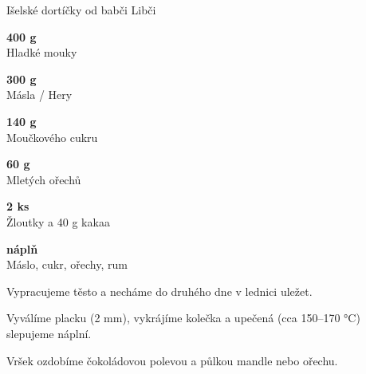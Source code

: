 \documentclass[11pt,a4paper]{article}
\begin{document}

\begin{recipe}[BrickRed]{Išelské dortíčky od babči Libči}
    \begin{ingredients}
        \item \parbox[t]{\linewidth}{\raggedright \weight \textbf{400 g}\\ Hladké mouky}
        \item \parbox[t]{\linewidth}{\raggedright \weight \textbf{300 g}\\ Másla / Hery}
        \item \parbox[t]{\linewidth}{\raggedright \weight \textbf{140 g}\\ Moučkového cukru}
        \item \parbox[t]{\linewidth}{\raggedright \weight \textbf{60 g}\\ Mletých ořechů}
        \item \parbox[t]{\linewidth}{\raggedright \piece \textbf{2 ks}\\ Žloutky a 40 g kakaa}
        \item \parbox[t]{\linewidth}{\raggedright \indefinite \textbf{náplň}\\ Máslo, cukr, ořechy, rum}
    \end{ingredients}
    \begin{steps}
        \item Vypracujeme těsto a necháme do druhého dne v lednici uležet.
        \item Vyválíme placku (2 mm), vykrájíme kolečka a upečená (cca 150--170 °C) slepujeme náplní.
        \item Vršek ozdobíme čokoládovou polevou a půlkou mandle nebo ořechu.
    \end{steps}
\end{recipe}
\end{document}
